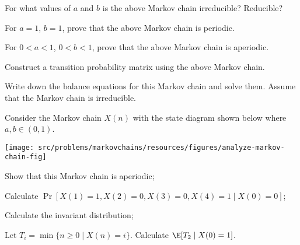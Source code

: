 \begin{Parts}

\Part For what values of $a$ and $b$ is the above Markov chain irreducible? Reducible?

\Part For $a=1$, $b=1$, prove that the above Markov chain is periodic.

\Part For $0 < a < 1$, $0 < b < 1$, prove that the above Markov chain is aperiodic.

\Part Construct a transition probability matrix using the above Markov chain.

\Part Write down the balance equations for this Markov chain and solve them. Assume that the Markov chain is irreducible.

\end{Parts}



Consider the Markov chain $X(n)$ with the state diagram shown below where $a, b \in (0, 1)$.

\begin{center}
  \texttt{[image: src/problems/markovchains/resources/figures/analyze-markov-chain-fig]}
\end{center}

\begin{Parts}
\Part Show that this Markov chain is aperiodic;

\Part Calculate $\Pr[X(1) = 1, X(2) = 0, X(3) = 0, X(4) = 1 \mid X(0) = 0]$;

\Part Calculate the invariant distribution;

\Part Let $T_i = \min\{n \geq 0 \mid X(n) = i\}$.  Calculate $\E[T_2 \mid X(0) = 1]$.
\end{Parts}


